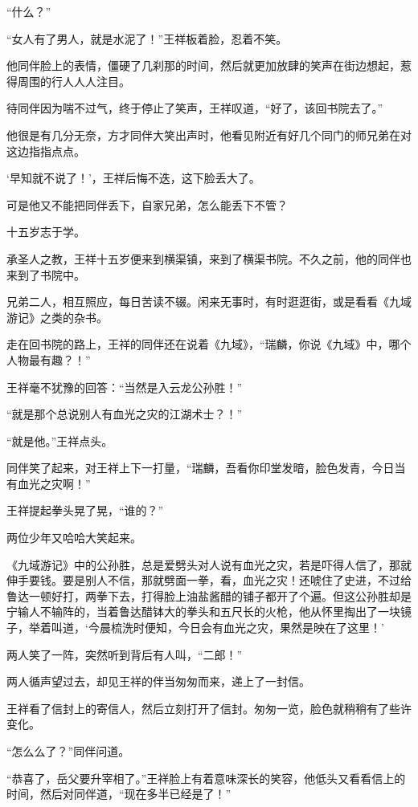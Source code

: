 “什么？”

“女人有了男人，就是水泥了！”王祥板着脸，忍着不笑。

他同伴脸上的表情，僵硬了几刹那的时间，然后就更加放肆的笑声在街边想起，惹得周围的行人人人注目。

待同伴因为喘不过气，终于停止了笑声，王祥叹道，“好了，该回书院去了。”

他很是有几分无奈，方才同伴大笑出声时，他看见附近有好几个同门的师兄弟在对这边指指点点。

‘早知就不说了！’，王祥后悔不迭，这下脸丢大了。

可是他又不能把同伴丢下，自家兄弟，怎么能丢下不管？

十五岁志于学。

承圣人之教，王祥十五岁便来到横渠镇，来到了横渠书院。不久之前，他的同伴也来到了书院中。

兄弟二人，相互照应，每日苦读不辍。闲来无事时，有时逛逛街，或是看看《九域游记》之类的杂书。

走在回书院的路上，王祥的同伴还在说着《九域》，“瑞麟，你说《九域》中，哪个人物最有趣？！”

王祥毫不犹豫的回答：“当然是入云龙公孙胜！”

“就是那个总说别人有血光之灾的江湖术士？！”

“就是他。”王祥点头。

同伴笑了起来，对王祥上下一打量，“瑞麟，吾看你印堂发暗，脸色发青，今日当有血光之灾啊！”

王祥提起拳头晃了晃，“谁的？”

两位少年又哈哈大笑起来。

《九域游记》中的公孙胜，总是爱劈头对人说有血光之灾，若是吓得人信了，那就伸手要钱。要是别人不信，那就劈面一拳，看，血光之灾！还唬住了史进，不过给鲁达一顿好打，两拳下去，打得脸上油盐酱醋的铺子都开了个遍。但这公孙胜却是宁输人不输阵的，当着鲁达醋钵大的拳头和五尺长的火枪，他从怀里掏出了一块镜子，举着叫道，‘今晨梳洗时便知，今日会有血光之灾，果然是映在了这里！’

两人笑了一阵，突然听到背后有人叫，“二郎！”

两人循声望过去，却见王祥的伴当匆匆而来，递上了一封信。

王祥看了信封上的寄信人，然后立刻打开了信封。匆匆一览，脸色就稍稍有了些许变化。

“怎么么了？”同伴问道。

“恭喜了，岳父要升宰相了。”王祥脸上有着意味深长的笑容，他低头又看看信上的时间，然后对同伴道，“现在多半已经是了！”

